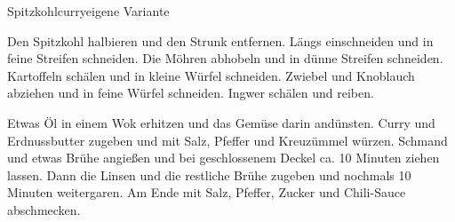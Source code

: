 \begin{recipe}{Spitzkohlcurry}{eigene Variante}
  \label{Spitzkohlcurry}
  \inglist
  
  \steps
  
  Den Spitzkohl halbieren und den Strunk entfernen. Längs einschneiden und in
  feine Streifen schneiden. Die Möhren abhobeln und in dünne Streifen schneiden.
  Kartoffeln schälen und in kleine Würfel schneiden. Zwiebel und Knoblauch
  abziehen und in feine Würfel schneiden. Ingwer schälen und reiben.

  Etwas Öl in einem Wok erhitzen und das Gemüse darin andünsten. Curry und
  Erdnussbutter zugeben und mit Salz, Pfeffer und Kreuzümmel würzen. Schmand und
  etwas Brühe angießen und bei geschlossenem Deckel ca. 10 Minuten ziehen
  lassen. Dann die Linsen und die restliche Brühe zugeben und nochmals 10
  Minuten weitergaren. Am Ende mit Salz, Pfeffer, Zucker und Chili-Sauce abschmecken.
  
\end{recipe}
